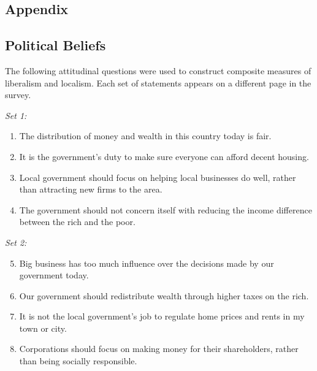 \documentclass[article,12pt]{memoir}
\begin{document}
\begin{SingleSpacing}

% 
\printbibliography


\clearpage

\appendix
\renewcommand\thefigure{\thechapter.\arabic{figure}}    
\renewcommand\thetable{\thechapter.\arabic{table}}

\chapter*{Appendix}
\setcounter{chapter}{1}
\setcounter{figure}{0}
\setcounter{table}{0}

\section{Political Beliefs}\label{sec:hg_e_political_beliefs}

The following attitudinal questions were used to construct composite measures of liberalism and localism.  Each set of statements appears on a different page in the survey.

\vspace{1em}\noindent \emph{Set 1:}
\begin{enumerate}
  \item The distribution of money and wealth in this country today is fair.
  \item It is the government's duty to make sure everyone can afford decent housing.
  \item Local government should focus on helping local businesses do well, rather than attracting new firms to the area.
  \item The government should not concern itself with reducing the income difference between the rich and the poor.
\end{enumerate}

\noindent \emph{Set 2:}
\begin{enumerate}
  \setcounter{enumi}{4}
  \item Big business has too much influence over the decisions made by our government today.
  \item Our government should redistribute wealth through higher taxes on the rich.
  \item It is not the local government's job to regulate home prices and rents in my town or city.
  \item Corporations should focus on making money for their shareholders, rather than being socially responsible.
\end{enumerate}


\end{SingleSpacing}
\end{document}
